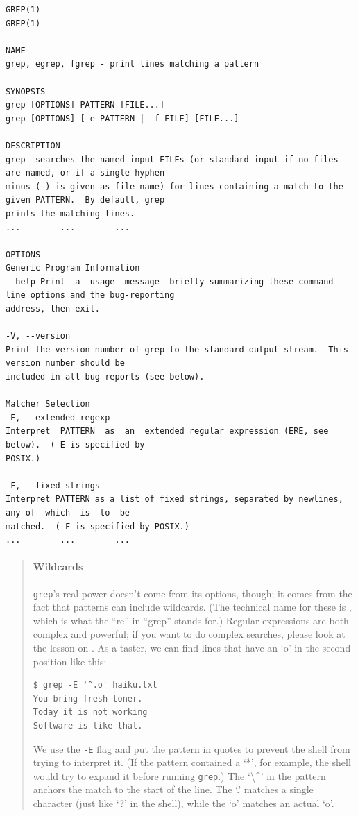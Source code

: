 \documentclass{book}
\begin{document}
\begin{verbatim}
GREP(1)                                                                                              GREP(1)

NAME
grep, egrep, fgrep - print lines matching a pattern

SYNOPSIS
grep [OPTIONS] PATTERN [FILE...]
grep [OPTIONS] [-e PATTERN | -f FILE] [FILE...]

DESCRIPTION
grep  searches the named input FILEs (or standard input if no files are named, or if a single hyphen-
minus (-) is given as file name) for lines containing a match to the given PATTERN.  By default, grep
prints the matching lines.
...        ...        ...

OPTIONS
Generic Program Information
--help Print  a  usage  message  briefly summarizing these command-line options and the bug-reporting
address, then exit.

-V, --version
Print the version number of grep to the standard output stream.  This version number should be
included in all bug reports (see below).

Matcher Selection
-E, --extended-regexp
Interpret  PATTERN  as  an  extended regular expression (ERE, see below).  (-E is specified by
POSIX.)

-F, --fixed-strings
Interpret PATTERN as a list of fixed strings, separated by newlines, any of  which  is  to  be
matched.  (-F is specified by POSIX.)
...        ...        ...
\end{verbatim}

\begin{quote}
\mbox{}\paragraph{Wildcards}

\texttt{grep}'s real power doesn't come from its options, though; it
comes from the fact that patterns can include wildcards. (The technical
name for these is ,
which is what the ``re'' in ``grep'' stands for.) Regular expressions
are both complex and powerful; if you want to do complex searches,
please look at the lesson on . As a taster, we can find lines that have an `o' in the second
position like this:

\begin{verbatim}
$ grep -E '^.o' haiku.txt
You bring fresh toner.
Today it is not working
Software is like that.
\end{verbatim}

We use the \texttt{-E} flag and put the pattern in quotes to prevent the
shell from trying to interpret it. (If the pattern contained a `*', for
example, the shell would try to expand it before running \texttt{grep}.)
The `\textbackslash{}\^{}' in the pattern anchors the match to the start
of the line. The `.' matches a single character (just like `?' in the
shell), while the `o' matches an actual `o'.
\end{quote}
\end{document}
